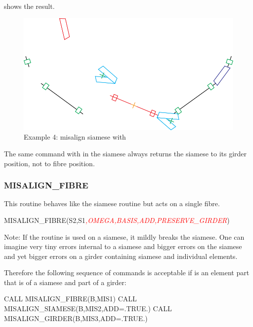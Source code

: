  shows the result.

\begin{figure}[ht]
  \centering
  \includegraphics[width=.9\textwidth]{illustrations/misalign-fig6}
  \caption{Example 4: misalign siamese with }
  \label{fig:Example-4}
\end{figure}

The same command with  in the siamese always returns the siamese
to its girder position, not to fibre position.


\subsubsection{MISALIGN\_FIBRE}

%
This routine behaves like the siamese routine but acts on a single fibre.

\begin{ptccode}
MISALIGN_FIBRE(S2,S1\textit{\textcolor{red}{,OMEGA,BASIS,ADD,PRESERVE_GIRDER}})
\end{ptccode}

Note: If the  routine is used on a siamese, it mildly
breaks the siamese. One can imagine very tiny errors internal to a
siamese and bigger errors on the siamese and yet bigger errors on
a girder containing siamese and individual elements.

Therefore the following sequence of commands is acceptable if  is
an element part that is of a siamese and part of a girder:

\begin{ptccode}
CALL MISALIGN_FIBRE(B,MIS1)
CALL MISALIGN_SIAMESE(B,MIS2,ADD=.TRUE.)
CALL MISALIGN_GIRDER(B,MIS3,ADD=.TRUE.)
\end{ptccode}

